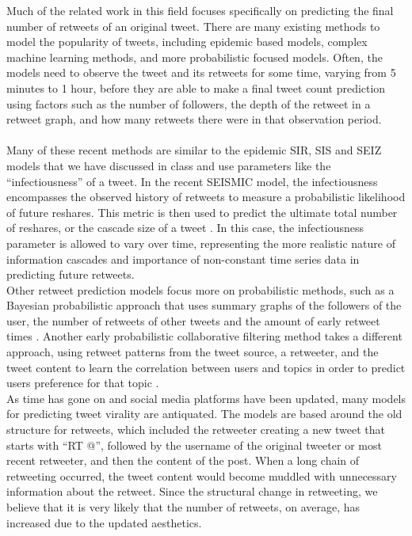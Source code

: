 \documentclass[twoside,twocolumn]{article}
\begin{document}
Much of the related work in this field focuses specifically on predicting the final number of retweets of an original tweet. There are many existing methods to model the popularity of tweets, including epidemic based models, complex machine learning methods, and more probabilistic focused models. Often, the models need to observe the tweet and its retweets for some time, varying from 5 minutes to 1 hour, before they are able to make a final tweet count prediction using factors such as the number of followers, the depth of the retweet in a retweet graph, and how many retweets there were in that observation period.  \\ \\
Many of these recent methods are similar to the epidemic SIR, SIS and SEIZ models that we have discussed in class and use parameters like the “infectiousness” of a tweet. In the recent SEISMIC model, the infectiousness encompasses the observed history of retweets to measure a probabilistic likelihood of future reshares. This metric is then used to predict the ultimate total number of reshares, or the cascade size of a tweet \cite{7}. In this case, the infectiousness parameter is allowed to vary over time, representing the more realistic nature of information cascades and importance of non-constant time series data in predicting future retweets.\\

Other retweet prediction models focus more on probabilistic methods, such as a Bayesian probabilistic approach that uses summary graphs of the followers of the user, the number of retweets of other tweets and the amount of early retweet times \cite{2}. Another early probabilistic collaborative filtering method takes a different approach, using retweet patterns from the tweet source, a retweeter, and the tweet content to learn the correlation between users and topics in order to predict users preference for that topic \cite{3}.\\
 
 As time has gone on and social media platforms have been updated, many models for predicting tweet virality are antiquated. The models are based around the old structure for retweets, which included the retweeter creating a new tweet that starts with “RT @”, followed by the username of the original tweeter or most recent retweeter, and then the content of the post. When a long chain of retweeting occurred, the tweet content would become muddled with unnecessary information about the retweet. Since the structural change in retweeting, we believe that it is very likely that the number of retweets, on average, has increased due to the updated aesthetics.\\
 
\end{document}
